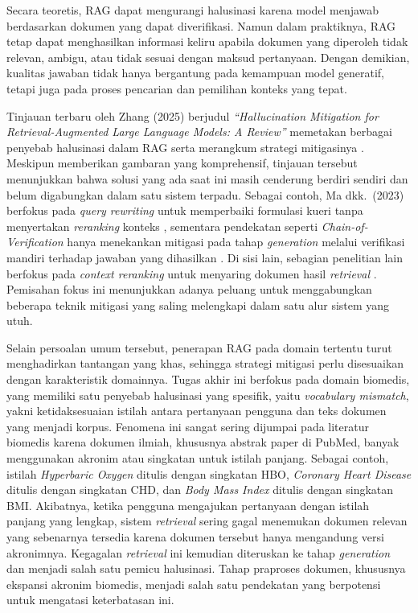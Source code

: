 Secara teoretis, RAG dapat mengurangi halusinasi karena model menjawab berdasarkan dokumen yang dapat diverifikasi. Namun dalam praktiknya, RAG tetap dapat menghasilkan informasi keliru apabila dokumen yang diperoleh tidak relevan, ambigu, atau tidak sesuai dengan maksud pertanyaan. Dengan demikian, kualitas jawaban tidak hanya bergantung pada kemampuan model generatif, tetapi juga pada proses pencarian dan pemilihan konteks yang tepat.

Tinjauan terbaru oleh Zhang (2025) berjudul \textit{“Hallucination Mitigation for Retrieval-Augmented Large Language Models: A Review”} memetakan berbagai penyebab halusinasi dalam RAG serta merangkum strategi mitigasinya \parencite{math2024hallucination}. Meskipun memberikan gambaran yang komprehensif, tinjauan tersebut menunjukkan bahwa solusi yang ada saat ini masih cenderung berdiri sendiri dan belum digabungkan dalam satu sistem terpadu. Sebagai contoh, Ma dkk.\ (2023) berfokus pada \textit{query rewriting} untuk memperbaiki formulasi kueri tanpa menyertakan \textit{reranking} konteks \parencite{ma2023queryrewriting}, sementara pendekatan seperti \textit{Chain-of-Verification} hanya menekankan mitigasi pada tahap \textit{generation} melalui verifikasi mandiri terhadap jawaban yang dihasilkan \parencite{dhuliawala2024cove}. Di sisi lain, sebagian penelitian lain berfokus pada \textit{context reranking} untuk menyaring dokumen hasil \textit{retrieval} \parencite{craft2023richresponses}. Pemisahan fokus ini menunjukkan adanya peluang untuk menggabungkan beberapa teknik mitigasi yang saling melengkapi dalam satu alur sistem yang utuh.

Selain persoalan umum tersebut, penerapan RAG pada domain tertentu turut menghadirkan tantangan yang khas, sehingga strategi mitigasi perlu disesuaikan dengan karakteristik domainnya. Tugas akhir ini berfokus pada domain biomedis, yang memiliki satu penyebab halusinasi yang spesifik, yaitu \textit{vocabulary mismatch}, yakni ketidaksesuaian istilah antara pertanyaan pengguna dan teks dokumen yang menjadi korpus. Fenomena ini sangat sering dijumpai pada literatur biomedis karena dokumen ilmiah, khususnya abstrak paper di PubMed, banyak menggunakan akronim atau singkatan untuk istilah panjang. Sebagai contoh, istilah \textit{Hyperbaric Oxygen} ditulis dengan singkatan HBO, \textit{Coronary Heart Disease} ditulis dengan singkatan CHD, dan \textit{Body Mass Index} ditulis dengan singkatan BMI. Akibatnya, ketika pengguna mengajukan pertanyaan dengan istilah panjang yang lengkap, sistem \textit{retrieval} sering gagal menemukan dokumen relevan yang sebenarnya tersedia karena dokumen tersebut hanya mengandung versi akronimnya. Kegagalan \textit{retrieval} ini kemudian diteruskan ke tahap \textit{generation} dan menjadi salah satu pemicu halusinasi. Tahap praproses dokumen, khususnya ekspansi akronim biomedis, menjadi salah satu pendekatan yang berpotensi untuk mengatasi keterbatasan ini.

